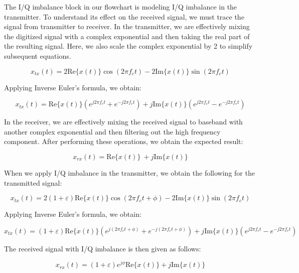 \documentclass{article}
\begin{document}
The I/Q imbalance block in our flowchart is modeling I/Q imbalance in the transmitter. To understand its effect on the received signal, we must trace the signal from transmitter to receiver. In the transmitter, we are effectively mixing the digitized signal with a complex exponential and then taking the real part of the resulting signal. Here, we also scale the complex exponential by 2 to simplify subsequent equations.

\begin{equation}
	x_{tx}(t) = 2\text{Re}\{x(t)\}\cos(2{\pi}f_ct) - 2\text{Im}\{x(t)\}\sin(2{\pi}f_ct)
\end{equation}

Applying Inverse Euler's formula, we obtain:

\begin{equation}
	x_{tx}(t) = \text{Re}\{x(t)\}(e^{j2{\pi}f_ct} + e^{-j2{\pi}f_ct}) + j\text{Im}\{x(t)\}(e^{j2{\pi}f_ct} - e^{-j2{\pi}f_ct})
\end{equation}

In the receiver, we are effectively mixing the received signal to baseband with another complex exponential and then filtering out the high frequency component. After performing these operations, we obtain the expected result:
 
\begin{equation}
	x_{rx}(t) = \text{Re}\{x(t)\}\ + j\text{Im}\{x(t)\}
\end{equation}

When we apply I/Q imbalance in the transmitter, we obtain the following for the transmitted signal:

\begin{equation}
	x_{tx}(t) = 2(1+\varepsilon)\text{Re}\{x(t)\}\cos(2{\pi}f_ct + \phi) - 2\text{Im}\{x(t)\}\sin(2{\pi}f_ct)
\end{equation}

Applying Inverse Euler's formula, we obtain:

\begin{equation}
	x_{tx}(t) = (1+\varepsilon)\text{Re}\{x(t)\}(e^{j(2{\pi}f_ct+\phi)} + e^{-j(2{\pi}f_ct+\phi)}) + j\text{Im}\{x(t)\}(e^{j2{\pi}f_ct} - e^{-j2{\pi}f_ct})
\end{equation}

The received signal with I/Q imbalance is then given as follows:

\begin{equation}
	x_{rx}(t) = (1+\varepsilon)e^{j\phi}\text{Re}\{x(t)\} + j\text{Im}\{x(t)\}
\end{equation}
\end{document}
